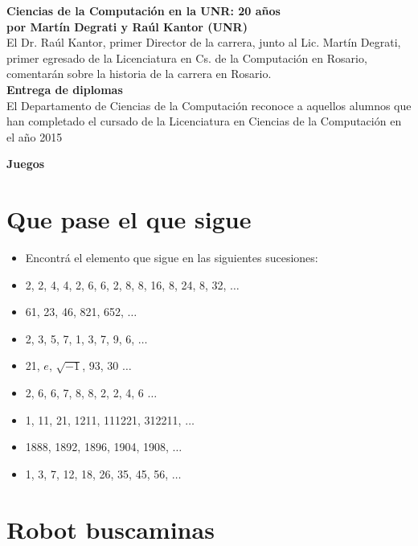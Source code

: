 \documentclass[12pt, a4paper]{article}
\newcommand{\charla}[3]{
	{\large\bf#1}\\
	{\bf por #2}\\
	#3\\
}
\begin{document}
\charla
{Ciencias de la Computación en la UNR: 20 años}
{Martín Degrati y Raúl Kantor (UNR)}
{El Dr. Raúl Kantor, primer Director de la carrera, junto al Lic. Martín Degrati, primer egresado de la Licenciatura en Cs. de la Computación en Rosario, comentarán sobre la historia de la carrera en Rosario.}

{\large\bf{Entrega de diplomas}}\\
{El Departamento de Ciencias de la Computación reconoce a aquellos alumnos que han completado el cursado de la Licenciatura en Ciencias de la Computación en el año 2015}

\newpage

\begin{center}\LARGE\bf Juegos\end{center}

\section*{Que pase el que sigue}
\begin{itemize}
\item Encontrá el elemento que sigue en las siguientes sucesiones:
\item 2, 2, 4, 4, 2, 6, 6, 2, 8, 8, 16, 8, 24, 8, 32, $\dots$
\item 61, 23, 46, 821, 652, $\dots$
\item 2, 3, 5, 7, 1, 3, 7, 9, 6, $\dots$
\item 21, $e$, $\sqrt{-1}$, 93, 30 $\dots$
\item 2, 6, 6, 7, 8, 8, 2, 2, 4, 6 $\dots$ 
\item 1, 11, 21, 1211, 111221, 312211, $\dots$
\item 1888, 1892, 1896, 1904, 1908, $\dots$
\item 1, 3, 7, 12, 18, 26, 35, 45, 56, $\dots$
\end{itemize}


\section*{Robot buscaminas}
\end{document}
